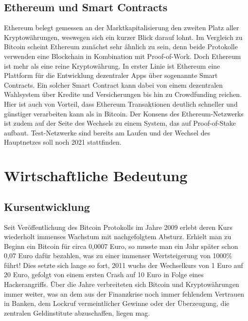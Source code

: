 \documentclass[12pt,oneside]{article}
\begin{document}
\subsection{Ethereum und Smart Contracts}

Ethereum belegt gemessen an der Marktkapitalisierung den zweiten Platz aller Kryptowährungen, weswegen sich ein kurzer Blick darauf lohnt. Im Vergleich zu Bitcoin scheint Ethereum zunächst sehr ähnlich zu sein, denn beide Protokolle verwenden eine Blockchain in Kombination mit Proof-of-Work. Doch Ethereum ist mehr als eine reine Kryptowährung. In erster Linie ist Ethereum eine Plattform für die Entwicklung dezentraler Apps über sogenannte Smart Contracts. Ein solcher Smart Contract kann dabei von einem dezentralen Wahlsystem über Kredite und Versicherungen bis hin zu Crowdfunding reichen. Hier ist auch von Vorteil, dass Ethereum Transaktionen deutlich schneller und günstiger verarbeiten kann als in Bitcoin. Der Konsens des Ethereum-Netzwerks ist zudem auf der Seite des Wechsels zu einem System, das auf Proof-of-Stake aufbaut. Test-Netzwerke sind bereits am Laufen und der Wechsel des Hauptnetzes soll noch 2021 stattfinden. \cite[p. 119-121]{soeteman2019} \cite{eth2021}

\newpage
\section{Wirtschaftliche Bedeutung}



\subsection{Kursentwicklung}

Seit Veröffentlichung des Bitcoin Protokolls im Jahre 2009 erlebt deren Kurs wiederholt immenses Wachstum mit nachgefolgtem Absturz. Erhielt man zu Beginn ein Bitcoin für circa 0,0007 Euro, so musste man ein Jahr später schon 0,07 Euro dafür bezahlen, was zu einer immenser Wertsteigerung von 1000\% führt! Dies setzte sich lange so fort, 2011 wuchs der Wechselkurs von 1 Euro auf 20 Euro, gefolgt von einem ersten Crash auf 10 Euro in Folge eines Hackerangriffs. Über die Jahre verbreiteten sich Bitcoin und Kryptowährungen immer weiter, was an dem aus der Finanzkrise noch immer fehlendem Vertrauen in Banken, dem Lockruf vermeintlicher Gewinne oder der Überzeugung, die zentralen Geldinstitute abzuschaffen, liegen mag. 
\end{document}
